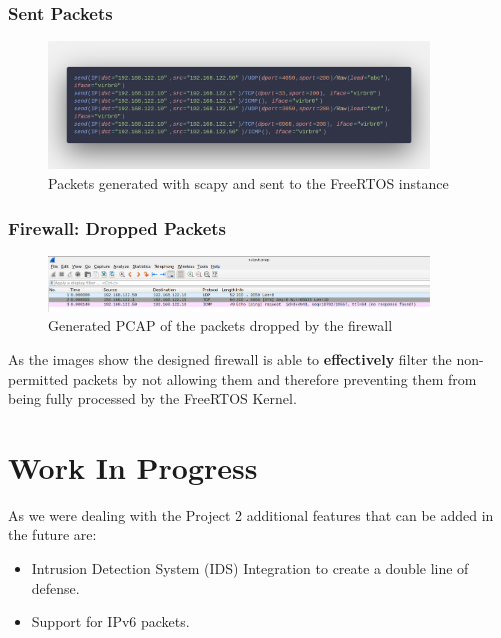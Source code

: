 \documentclass{exam}
\begin{document}
\subsubsection*{Sent Packets}
\begin{figure}[h]
    \centering
    \includegraphics[width=0.90\textwidth]{graphics/scapyRules.png}
    \caption{Packets generated with scapy and sent to the FreeRTOS instance}
\end{figure}
\subsubsection*{Firewall: Dropped Packets}
\begin{figure}[H]
    \centering
    \includegraphics[width=0.9\textwidth]{images/droppedPcap.png}
    \caption{Generated PCAP of the packets dropped by the firewall}
\end{figure}
As the images show the designed firewall is able to \textbf{effectively} filter the non-permitted packets by not allowing them and therefore preventing them from being fully processed by the FreeRTOS Kernel.
\pagebreak
\section{Work In Progress}
As we were dealing with the Project 2 additional features that can be added in the future are:
\begin{itemize}
    \item Intrusion Detection System (IDS) Integration to create a double line of defense.
    \item Support for IPv6 packets.
\end{itemize}
\end{document}
